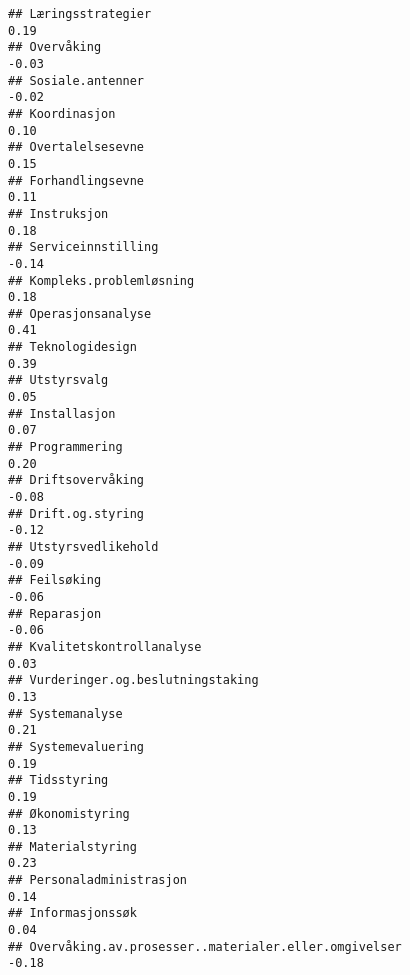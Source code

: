 \documentclass[
]{article}
\begin{document}
\begin{verbatim}
## Læringsstrategier                                                                 0.19
## Overvåking                                                                       -0.03
## Sosiale.antenner                                                                 -0.02
## Koordinasjon                                                                      0.10
## Overtalelsesevne                                                                  0.15
## Forhandlingsevne                                                                  0.11
## Instruksjon                                                                       0.18
## Serviceinnstilling                                                               -0.14
## Kompleks.problemløsning                                                           0.18
## Operasjonsanalyse                                                                 0.41
## Teknologidesign                                                                   0.39
## Utstyrsvalg                                                                       0.05
## Installasjon                                                                      0.07
## Programmering                                                                     0.20
## Driftsovervåking                                                                 -0.08
## Drift.og.styring                                                                 -0.12
## Utstyrsvedlikehold                                                               -0.09
## Feilsøking                                                                       -0.06
## Reparasjon                                                                       -0.06
## Kvalitetskontrollanalyse                                                          0.03
## Vurderinger.og.beslutningstaking                                                  0.13
## Systemanalyse                                                                     0.21
## Systemevaluering                                                                  0.19
## Tidsstyring                                                                       0.19
## Økonomistyring                                                                    0.13
## Materialstyring                                                                   0.23
## Personaladministrasjon                                                            0.14
## Informasjonssøk                                                                   0.04
## Overvåking.av.prosesser..materialer.eller.omgivelser                             -0.18

\end{verbatim}
\end{document}
